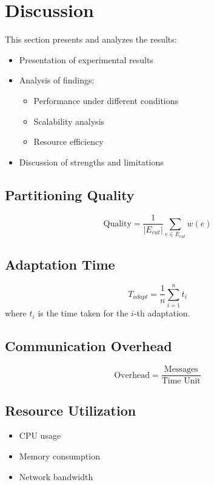 \section{Discussion}
This section presents and analyzes the results:
\begin{itemize}
    \item Presentation of experimental results
    \item Analysis of findings:
        \begin{itemize}
            \item Performance under different conditions
            \item Scalability analysis
            \item Resource efficiency
        \end{itemize}
    \item Discussion of strengths and limitations
\end{itemize}

\subsection{Partitioning Quality}
\begin{equation}
    \text{Quality} = \frac{1}{|E_{cut}|} \sum_{e \in E_{cut}} w(e)
\end{equation}

\subsection{Adaptation Time}
\begin{equation}
    T_{adapt} = \frac{1}{n} \sum_{i=1}^{n} t_i
\end{equation}
where $t_i$ is the time taken for the $i$-th adaptation.

\subsection{Communication Overhead}
\begin{equation}
    \text{Overhead} = \frac{\text{Messages}}{\text{Time Unit}}
\end{equation}

\subsection{Resource Utilization}
\begin{itemize}
    \item CPU usage
    \item Memory consumption
    \item Network bandwidth
\end{itemize}

